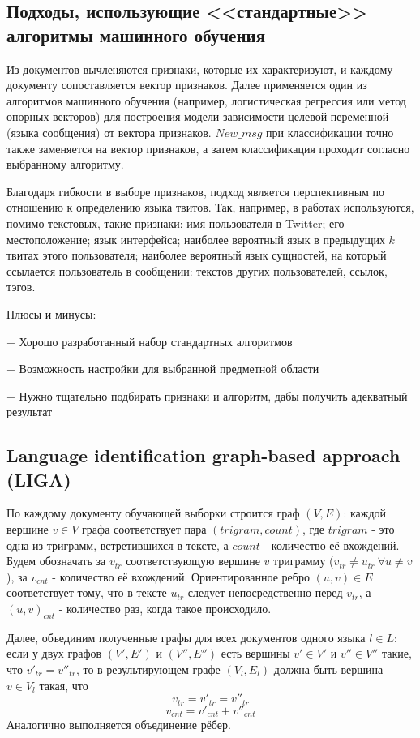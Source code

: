 \documentclass[a4paper, 14pt]{article}
\begin{document}
		\subsection{Подходы, использующие <<стандартные>> алгоритмы машинного обучения}
		Из документов вычленяются признаки, которые их характеризуют, и каждому документу сопоставляется вектор признаков. Далее применяется
		один из алгоритмов машинного обучения (например, логистическая регрессия или метод опорных векторов) для построения модели зависимости
		целевой переменной (языка сообщения) от вектора признаков. $New\_msg$ при классификации точно также заменяется на вектор признаков,
		а затем классификация проходит согласно выбранному алгоритму.
		
		Благодаря гибкости в выборе признаков, подход является перспективным по отношению к определению языка твитов. Так, например, в работах \cite{ppm} \cite{lrev}
		используются, помимо текстовых, такие признаки: имя пользователя в Twitter; его местоположение; язык интерфейса; наиболее вероятный
		язык в предыдущих $k$ твитах этого пользователя; наиболее вероятный язык сущностей, на который ссылается пользователь в сообщении: текстов
		других пользователей, ссылок, тэгов.
		
		\noindent Плюсы и минусы:
		
		$+$ Хорошо разработанный набор стандартных алгоритмов
		
		$+$ Возможность настройки для выбранной предметной области
		
		$-$ Нужно тщательно подбирать признаки и алгоритм, дабы получить адекватный результат
		
		\subsection{Language identification graph-based approach (LIGA)}
		По каждому документу обучающей выборки строится граф $(V, E)$:
		 каждой вершине $v \in V$ графа соответствует пара $(trigram, count)$, где $trigram$ - это одна
		из триграмм, встретившихся в тексте, а $count$ - количество её вхождений. Будем обозначать за $v_{tr}$ соответствующую вершине $v$ триграмму
		($v_{tr} \neq u_{tr} \ \forall u \neq v$), за $v_{cnt}$ - количество её вхождений. 
		Ориентированное ребро $(u, v) \in E$ соответствует тому, что в тексте $u_{tr}$ следует непосредственно
		перед $v_{tr}$, а $(u, v)_{cnt}$ - количество раз, когда такое происходило.
		
		Далее, объединим полученные графы для всех документов одного языка $l \in L$: если у двух графов $(V', E')$ и $(V'', E'')$ есть вершины
		$v' \in V'$ и $v'' \in V''$ такие, что $v'_{tr} = v''_{tr}$, то в результирующем графе $(V_{l}, E_{l})$ должна быть вершина 
		$v \in V_{l}$ такая, что 
		$$v_{tr} = v'_{tr} = v''_{tr}$$ $$v_{cnt} = v'_{cnt} + v''_{cnt}$$
		Аналогично выполняется объединение рёбер.
		
\end{document}
